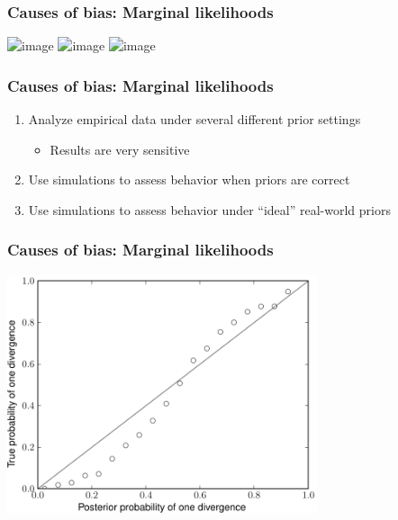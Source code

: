 \begin{frame}
    \frametitle{Causes of bias: Marginal likelihoods}
    \centerline{
        \includegraphics<1>[height=8.0cm]{images/marginal-plot-3d-bare.png}
        \includegraphics<2>[height=8.0cm]{images/marginal-plot-3d-prior.png}
        \includegraphics<3>[height=8.0cm]{images/marginal-plot-3d.png}}
\end{frame}

\begin{frame}
    \frametitle{Causes of bias: Marginal likelihoods}
    \begin{enumerate}
        \item<3-> Analyze empirical data under several different prior settings
            \begin{itemize}
                \item<3-> Results are very sensitive
            \end{itemize}
        \item<4-> Use simulations to assess behavior when priors are correct
        \item<5-> Use simulations to assess behavior under ``ideal'' real-world priors
    \end{enumerate}
\end{frame}

\begin{frame}
    \frametitle{Causes of bias: Marginal likelihoods}
    \centerline{
    \includegraphics[height=7.0cm]{images/validation-model-choice-old.pdf}}
\end{frame}

